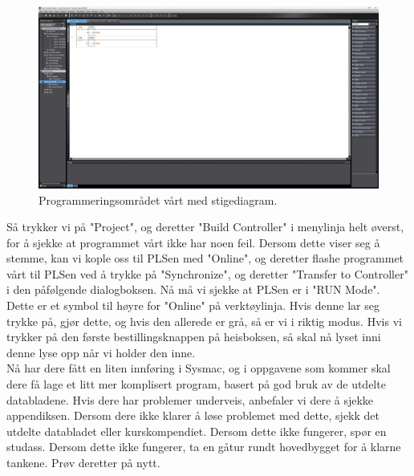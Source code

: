 \begin{alphasection}
\begin{figure}[ht]
    \centering
    \includegraphics[scale=0.2]{Main/figures/full_rung.png}
    \caption{Programmeringsområdet vårt med stigediagram.}
    \label{fig:full_rung}
\end{figure}

Så trykker vi på "Project", og deretter "Build Controller" i menylinja helt øverst, for å sjekke at programmet vårt ikke har noen feil. Dersom dette viser seg å stemme, kan vi kople oss til PLSen med "Online", og deretter flashe programmet vårt til PLSen ved å trykke på "Synchronize", og deretter "Transfer to Controller" i den påfølgende dialogboksen. Nå må vi sjekke at PLSen er i "RUN Mode". Dette er et symbol til høyre for "Online" på verktøylinja. Hvis denne lar seg trykke på, gjør dette, og hvis den allerede er grå, så er vi i riktig modus. Hvis vi trykker på den første bestillingsknappen på heisboksen, så skal nå lyset inni denne lyse opp når vi holder den inne.\\

Nå har dere fått en liten innføring i Sysmac, og i oppgavene som kommer skal dere få lage et litt mer komplisert program, basert på god bruk av de utdelte databladene. Hvis dere har problemer underveis, anbefaler vi dere å sjekke appendiksen. Dersom dere ikke klarer å løse problemet med dette, sjekk det utdelte databladet eller kurskompendiet. Dersom dette ikke fungerer, spør en studass. Dersom dette ikke fungerer, ta en gåtur rundt hovedbygget for å klarne tankene. Prøv deretter på nytt.
\end{alphasection}

\setcounter{section}{0}